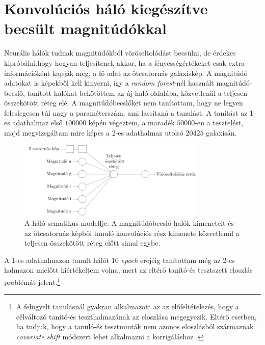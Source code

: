 \documentclass[12pt,letterpaper,twoside,openright]{book}
\begin{document}
 \section{Konvolúciós háló kiegészítve becsült magnitúdókkal}
 Neurális hálók tudnak magnitúdókból vöröseltolódást becsülni, de érdekes kipróbálni,hogy hogyan teljesítenek akkor, ha a fényességértékeket csak extra információként kapják meg, a fő adat az ötcsatornás galaxiskép. A magnitúdó adatokat is képekből kell kinyerni, így a \textit{random forest}-nél használt magnitúdó-becslő, tanított hálókat bekötöttem az új háló oldalába, közvetlenül a teljesen összekötött réteg elé. A magnitúdóbecslőket nem tanítottam, hogy ne legyen feleslegesen túl nagy a paraméterszám, ami lassítaná a tanulást. 
 \newline\indent 
 A tanítást az 1-es adathalmaz első $\num{100000}$ képén végeztem, a maradék $\num{50000}$-en a tesztelést, majd megvizsgáltam mire képes a 2-es adathalmaz utolsó $\num{20425}$ galaxisán.
 \begin{figure}[h!]
 \centering
 \includegraphics[width = 0.8\textwidth]{Figures/magnet.pdf}
 \caption{A háló sematikus modellje. A magnitúdóbecslő halók kimeneteit és az ötcsatornás képből tanuló konvolúciós rész kimenete közvetlenűl a teljesen összekötött réteg előtt simul egybe.}
 \label{fig:magnet}
 \end{figure}
A 1-es adathalmazon tanult hálót $10$ \textit{epoch} erejéig tanítottam még az 2-es halmazon mielőtt kiértékeltem volna, mert az eltérő tanító-és tesztszett eloszlás problémát jelent.\footnote{A felügyelt tanulásnál gyakran alkalmazott az az előfeltételezés, hogy a célváltozó tanító-és teszthalmazának az eloszlása megegyezik. Eltérő esetben, ha tudjuk, hogy a tanuló-és tesztminták nem azonos eloszlásból származnak \textit{covariate shift} módszert lehet alkalmazni a korrigáláshoz \cite{covs}.}
\newline\indent
\end{document}
